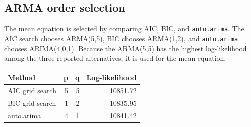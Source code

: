 \documentclass[
  11pt,
]{article}
\begin{document}
\subsection{ARMA order selection}\label{arma-order-selection}

The mean equation is selected by comparing AIC, BIC, and
\texttt{auto.arima}. The AIC search chooses ARMA(5,5), BIC chooses
ARMA(1,2), and \texttt{auto.arima} chooses ARIMA(4,0,1). Because the
ARMA(5,5) has the highest log-likelihood among the three reported
alternatives, it is used for the mean equation.

\begin{longtable}[]{@{}lrrr@{}}
\toprule\noalign{}
Method & p & q & Log-likelihood \\
\midrule\noalign{}
\endhead
\bottomrule\noalign{}
\endlastfoot
AIC grid search & 5 & 5 & 10851.72 \\
BIC grid search & 1 & 2 & 10835.95 \\
auto.arima & 4 & 1 & 10841.42 \\
\end{longtable}
\end{document}
